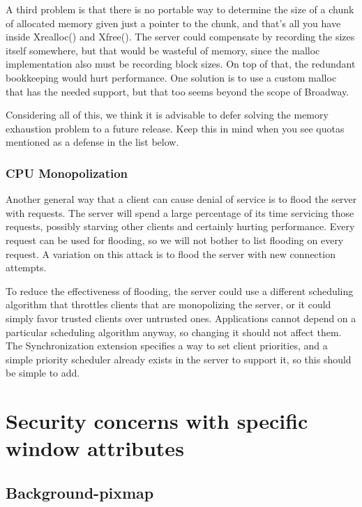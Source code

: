 A third problem is that there is no portable way to determine the size
of a chunk of allocated memory given just a pointer to the chunk, and
that's all you have inside Xrealloc() and Xfree().  The server could
compensate by recording the sizes itself somewhere, but that would be
wasteful of memory, since the malloc implementation also must be
recording block sizes.  On top of that, the redundant bookkeeping
would hurt performance.  One solution is to use a custom malloc that
has the needed support, but that too seems beyond the scope of
Broadway.

Considering all of this, we think it is advisable to defer solving the
memory exhaustion problem to a future release.  Keep this in mind when
you see quotas mentioned as a defense in the list below.

\subsubsection{CPU Monopolization}

Another general way that a client can cause denial of service is to
flood the server with requests.  The server will spend a large
percentage of its time servicing those requests, possibly starving
other clients and certainly hurting performance.  Every request can be
used for flooding, so we will not bother to list flooding on every
request.  A variation on this attack is to flood the server with new
connection attempts.

To reduce the effectiveness of flooding, the server could use a
different scheduling algorithm that throttles clients that are
monopolizing the server, or it could simply favor trusted clients over
untrusted ones.  Applications cannot depend on a particular scheduling
algorithm anyway, so changing it should not affect them.  The
Synchronization extension specifies a way to set client priorities,
and a simple priority scheduler already exists in the server to
support it, so this should be simple to add.



\section{Security concerns with specific window attributes}

\subsection{Background-pixmap}

